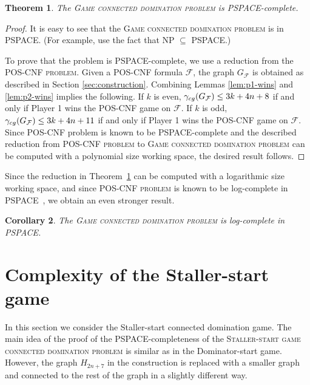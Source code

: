 \documentclass[12pt]{article}
\newtheorem{theorem}{Theorem}[section]
\newtheorem{corollary}[theorem]{Corollary}
\newcommand{\gcg}{\gamma_{\rm cg}}
\newcommand{\F}{\mathcal{F}}
\begin{document}
\begin{theorem}
	\label{thm:main}
	The \textsc{Game connected domination problem} is PSPACE-complete.
\end{theorem}

\begin{proof}
	It is easy to see that the \textsc{Game connected domination problem} is in PSPACE. (For example, use the fact that NP $\subseteq$ PSPACE.)
	
	To prove that the problem is PSPACE-complete, we use a reduction from the \textsc{POS-CNF problem}. Given a POS-CNF formula $\F$, the graph $G_\F$ is obtained as described in Section \ref{sec:construction}. Combining Lemmas \ref{lem:p1-wins} and \ref{lem:p2-wins} implies the following. If $k$ is even, $\gcg(G_\F) \leq 3k + 4n + 8$ if and only if Player 1 wins the POS-CNF game on $\F$. If $k$ is odd, $\gcg(G_\F) \leq 3k + 4n + 11$ if and only if Player 1 wins the POS-CNF game on $\F$. Since POS-CNF problem is known to be PSPACE-complete and the described reduction from \textsc{POS-CNF problem} to \textsc{Game connected domination problem} can be computed with a polynomial size working space, the desired result follows.
\end{proof}

Since the reduction in Theorem~\ref{thm:main} can be computed with a logarithmic size working space, and since \textsc{POS-CNF problem} is known to be log-complete in PSPACE~\cite{pos-cnf}, we obtain an even stronger result.

\begin{corollary}
	\label{cor:main}
	The \textsc{Game connected domination problem} is log-complete in PSPACE.
\end{corollary}

\section{Complexity of the Staller-start game}
\label{sec:S-game}

In this section we consider the Staller-start connected domination game. The main idea of the proof of the PSPACE-completeness of the \textsc{Staller-start game connected domination problem} is similar as in the Dominator-start game. However, the graph $H_{2n+7}$ in the construction is replaced with a smaller graph and connected to the rest of the graph in a slightly different way.
\end{document}
